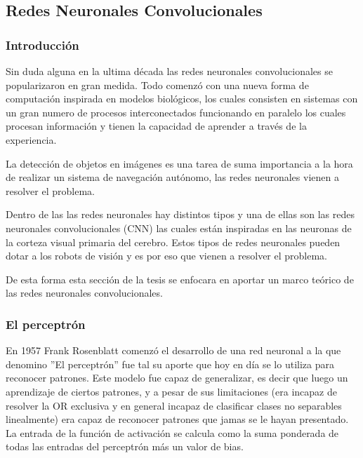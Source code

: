 \subsection{Redes Neuronales Convolucionales}

\subsubsection{Introducción}

Sin duda alguna en la ultima década las redes neuronales convolucionales se popularizaron en gran medida. Todo comenzó con una nueva forma de computación inspirada en modelos biológicos, los cuales consisten en sistemas con un gran numero de procesos interconectados funcionando en paralelo los cuales procesan información y tienen la capacidad de aprender a través de la experiencia.\par
La detección de objetos en imágenes es una tarea de suma importancia a la hora de realizar un sistema de navegación autónomo, las redes neuronales vienen a resolver el problema.\par
Dentro de las las redes neuronales hay distintos tipos y una de ellas son las redes neuronales convolucionales (CNN) las cuales están inspiradas en las neuronas de la corteza visual primaria del cerebro. Estos tipos de redes neuronales pueden dotar a los robots de visión y es por eso que vienen a resolver el problema.\par
De esta forma esta sección de la tesis se enfocara en aportar un marco teórico de las redes neuronales convolucionales.\par

\subsubsection{El perceptrón}

En 1957 Frank Rosenblatt comenzó el desarrollo de una red neuronal a la que denomino ''El perceptrón'' fue tal su aporte que hoy en día se lo utiliza para reconocer patrones. Este modelo fue capaz de generalizar, es decir que luego un aprendizaje de ciertos patrones, y a pesar de sus limitaciones (era incapaz de resolver la OR exclusiva y en general incapaz de clasificar clases no separables linealmente) era capaz de reconocer patrones que jamas se le hayan presentado.
La entrada de la función de activación se calcula como la suma ponderada de todas las entradas del perceptrón más un valor de bias.\par

